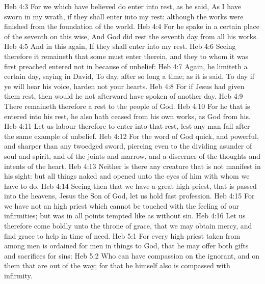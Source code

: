 \vs Heb 4:3 For we which have believed do enter into rest, as he said, As I have sworn in my wrath, if they shall enter into my rest: although the works were finished from the foundation of the world.
\vs Heb 4:4 For he spake in a certain place of the seventh  on this wise, And God did rest the seventh day from all his works.
\vs Heb 4:5 And in this  again, If they shall enter into my rest.
\vs Heb 4:6 Seeing therefore it remaineth that some must enter therein, and they to whom it was first preached entered not in because of unbelief:
\vs Heb 4:7 Again, he limiteth a certain day, saying in David, To day, after so long a time; as it is said, To day if ye will hear his voice, harden not your hearts.
\vs Heb 4:8 For if Jesus had given them rest, then would he not afterward have spoken of another day.
\vs Heb 4:9 There remaineth therefore a rest to the people of God.
\vs Heb 4:10 For he that is entered into his rest, he also hath ceased from his own works, as God  from his.
\vs Heb 4:11 Let us labour therefore to enter into that rest, lest any man fall after the same example of unbelief.
\vs Heb 4:12 For the word of God  quick, and powerful, and sharper than any twoedged sword, piercing even to the dividing asunder of soul and spirit, and of the joints and marrow, and  a discerner of the thoughts and intents of the heart.
\vs Heb 4:13 Neither is there any creature that is not manifest in his sight: but all things  naked and opened unto the eyes of him with whom we have to do.
\vs Heb 4:14 Seeing then that we have a great high priest, that is passed into the heavens, Jesus the Son of God, let us hold fast  profession.
\vs Heb 4:15 For we have not an high priest which cannot be touched with the feeling of our infirmities; but was in all points tempted like as  without sin.
\vs Heb 4:16 Let us therefore come boldly unto the throne of grace, that we may obtain mercy, and find grace to help in time of need.
\vs Heb 5:1 For every high priest taken from among men is ordained for men in things  to God, that he may offer both gifts and sacrifices for sins:
\vs Heb 5:2 Who can have compassion on the ignorant, and on them that are out of the way; for that he himself also is compassed with infirmity.
